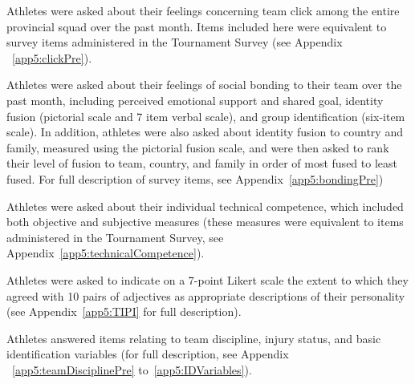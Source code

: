 Athletes were asked about their feelings concerning team click among the entire provincial squad over the past month. Items included here were equivalent to survey items administered in the Tournament Survey (see Appendix ~\ref{app5:clickPre}).

Athletes were asked about their feelings of social bonding to their team over the past month, including perceived emotional support and shared goal, identity fusion (pictorial scale and 7 item verbal scale), and group identification (six-item scale). In addition, athletes were also asked about identity fusion to country and family, measured using the pictorial fusion scale, and were then asked to rank their level of fusion to team, country, and family in order of most fused to least fused.  For full description of survey items, see Appendix~\ref{app5:bondingPre})

Athletes were asked about their individual technical competence, which included both objective and subjective measures (these measures were equivalent to items administered in the Tournament Survey, see Appendix~\ref{app5:technicalCompetence}).

Athletes were asked to indicate on a 7-point Likert scale the extent to which they agreed with 10 pairs of adjectives as appropriate descriptions of their personality (see Appendix~\ref{app5:TIPI} for full description).

Athletes answered items relating to team discipline, injury status, and basic identification variables (for full description, see Appendix ~\ref{app5:teamDisciplinePre} to~\ref{app5:IDVariables}).




